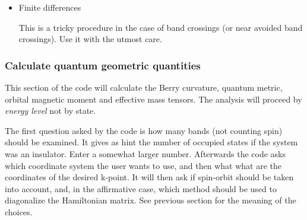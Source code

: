\documentclass[11pt]{article}
\begin{document}
\begin{itemize}
   This is a fast method, but in the end it will use a finite difference.
   Read in the next section the dangers of finite differences calculations of masses.
   It will ask first how many bands (not counting spin) should be included
   in the exploratory calculation.  It is not the number of bands
   of the k.p model.
   The code gives an idea of the recommended {\it order of magnitude} of the answer.
   Afterwards the code asks which coordinate system the user wants to use,
   and then what what are the coordinates of the desired k-point.
   It will then give the suggested values of the size of the k.p method.
   Choose one of the suggestions, unless you have a strong reason to use another value.



   \item{Finite differences}

   This is a tricky procedure in the case of band crossings (or near avoided band crossings).
   Use it with the utmost care.

\end{itemize}

\subsubsection{Calculate quantum geometric quantities}

   This section of the code will calculate the Berry curvature, quantum metric,
   orbital magnetic moment and effective mass tensors.
   The analysis will proceed by {\it energy level} not by state.

   The first question asked by the code is how many bands (not counting spin) should be examined.
   It gives as hint the number of occupied states if the system was an insulator.
   Enter a somewhat larger number.
   Afterwards the code asks which coordinate system the user wants to use,
   and then what what are the coordinates of the desired k-point.
   It will then ask if spin-orbit should be taken into account, and, in the
   affirmative case, which method should be used to diagonalize the Hamiltonian matrix.
   See previous section for the meaning of the choices.
\end{document}
